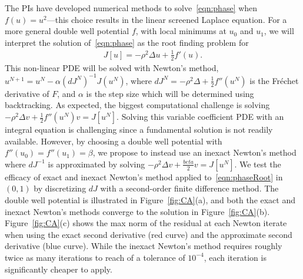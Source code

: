 The PIs have developed numerical methods to solve~\eqref{eqn:phase} when
$f(u) = u^2$---this choice results in the linear screened Laplace
equation. For a more general double well potential $f$, with local
minimums at $u_0$ and $u_1$, we will interpret the solution
of~\eqref{eqn:phase} as the root finding problem for
\begin{align}
  \label{eqn:phaseRoot}
  J[u] = -\rho^2 \Delta u + \tfrac{1}{2}f'(u).
\end{align}
This non-linear PDE will be solved with Newton's method, $u^{N+1} =
u^{N} - \alpha (dJ^N)^{-1} J(u^N)$, where $dJ^N = -\rho^2 \Delta +
\tfrac{1}{2}f''(u^N)$ is the Fr\'{e}chet derivative of $F$, and $\alpha$
is the step size which will be determined using backtracking. As
expected, the biggest computational challenge is solving $-\rho^2 \Delta
v + \tfrac{1}{2}f''(u^{N}) v = J[u^N]$. Solving this variable
coefficient PDE with an integral equation is challenging since a
fundamental solution is not readily available. However, by choosing a
double well potential with $f''(u_0) = f''(u_1) = \beta$, we propose to
instead use an inexact Newton's method where $dJ^{-1}$ is approximated
by solving $-\rho^2 \Delta v + \tfrac{beta}{2} v = J[u^N]$. We test the
efficacy of exact and inexact Newton's method applied
to~\eqref{eqn:phaseRoot} in $(0,1)$ by discretizing $dJ$ with a
second-order finite difference method. The double well potential is
illustrated in Figure~\ref{fig:CA}(a), and both the exact and inexact
Newton's methods converge to the solution in Figure~\ref{fig:CA}(b).
Figure~\ref{fig:CA}(c) shows the max norm of the residual at each Newton
iterate when using the exact second derivative (red curve) and the
approximate second derivative (blue curve). While the inexact Newton's
method requires roughly twice as many iterations to reach of a tolerance
of $10^{-4}$, each iteration is significantly cheaper to apply.

